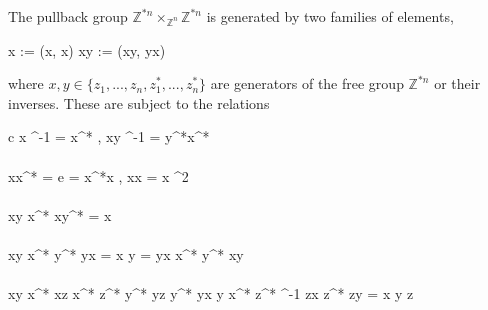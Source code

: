 \documentclass{amsbook} %
\newenvironment{eq*}{\begin{equation*}}{\end{equation*}}
\numberwithin{section}{chapter}
\begin{document}
\begin{prop} \label{pushpres} The pullback group $\mathbb{Z}^{\ast n} \times_{\mathbb{Z}^n} \mathbb{Z}^{\ast n}$ is generated by two families of elements,
\begin{eq*} \langle x \rangle \quad := \quad (x, x) \quad \quad {} \quad \quad \langle xy \rangle \quad := \quad (xy, yx) \end{eq*}
where $x,y \in \{z_1, ..., z_n, z_1^*, ..., z_n^*\}$ are generators of the free group $\mathbb{Z}^{\ast n}$ or their inverses. These are subject to the relations
\begin{eq*} \begin{array}{c}
			\langle x \rangle^{-1} \quad = \quad \langle x^* \rangle, \quad \quad \quad \langle xy \rangle^{-1} \quad = \quad \langle y^*x^* \rangle \\
			\\
			\langle xx^* \rangle \quad = \quad e \quad = \quad \langle x^*x \rangle, \quad \quad \quad \langle xx \rangle \quad = \quad \langle x \rangle^2 \\
			\\
			\langle xy \rangle \langle x^* \rangle \langle xy^* \rangle \quad = \quad \langle x \rangle \\
			\\
			\langle xy \rangle \langle x^* \rangle \langle y^* \rangle \langle yx \rangle \quad = \quad \langle x \rangle \langle y \rangle  \quad = \quad \langle yx \rangle \langle x^* \rangle \langle y^* \rangle \langle xy \rangle \\
			\\
			\langle xy \rangle \langle x^* \rangle \langle xz \rangle \langle x^* \rangle \langle z^* \rangle \langle y^* \rangle \langle yz \rangle \langle y^* \rangle \langle yx \rangle \langle y \rangle \langle x^* \rangle \langle z^* \rangle^{-1} \langle zx \rangle \langle z^* \rangle \langle zy \rangle \quad = \quad \langle x \rangle\langle y \rangle\langle z \rangle 
		\end{array}
\end{eq*}
\end{prop}
\end{document}

